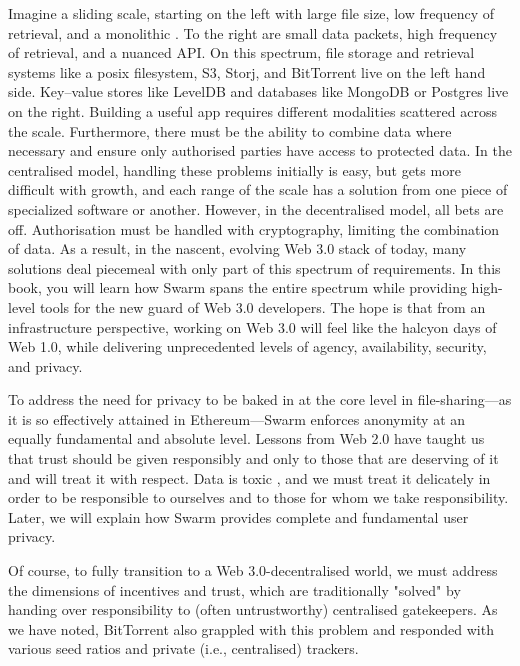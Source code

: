 Imagine a sliding scale, starting on the left with large file size, low frequency of retrieval, and a monolithic . To the right are small data packets, high frequency of retrieval, and a nuanced API. On this spectrum, file storage and retrieval systems like a posix filesystem, S3, Storj, and BitTorrent live on the left hand side. Key--value stores like LevelDB and databases like MongoDB or Postgres live on the right. Building a useful app requires different modalities scattered across the scale. Furthermore, there must be the ability to combine data where necessary and ensure only authorised parties have access to protected data. In the centralised model, handling these problems initially is easy, but gets more difficult with growth, and each range of the scale has a solution from one piece of specialized software or another. However, in the decentralised model, all bets are off. Authorisation must be handled with cryptography, limiting the combination of data. As a result, in the nascent, evolving Web 3.0 stack of today, many solutions deal piecemeal with only part of this spectrum of requirements. In this book, you will learn how Swarm spans the entire spectrum while providing high-level tools for the new guard of Web 3.0 developers. The hope is that from an infrastructure perspective, working on Web 3.0 will feel like the halcyon days of Web 1.0, while delivering unprecedented levels of agency, availability, security, and privacy.

To address the need for privacy to be baked in at the core level in file-sharing—as it is so effectively attained in Ethereum—Swarm enforces anonymity at an equally fundamental and absolute level. Lessons from Web 2.0 have taught us that trust should be given responsibly and only to those that are deserving of it and will treat it with respect. Data is toxic \cite{schneier2019Jul}, and we must treat it delicately in order to be responsible to ourselves and to those for whom we take responsibility. Later, we will explain how Swarm provides complete and fundamental user privacy.

Of course, to fully transition to a Web 3.0-decentralised world, we must address the dimensions of incentives and trust, which are traditionally "solved" by handing over responsibility to (often untrustworthy) centralised gatekeepers. As we have noted, BitTorrent also grappled with this problem and responded with various seed ratios and private (i.e., centralised) trackers.


